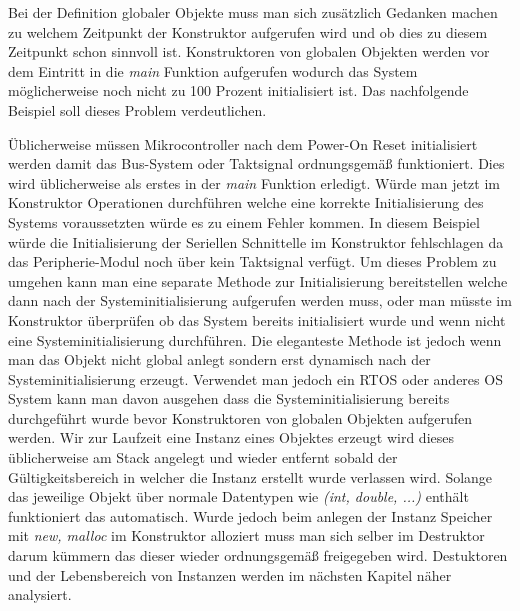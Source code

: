 \documentclass[MES,Master,ngerman]{twbook}%
\begin{document}
\begin{figure}[!htb]
	\begin{subfigure}[b]{0.5\textwidth}
		
		\label{fig:25}
	\end{subfigure}
	\begin{subfigure}[b]{0.5\textwidth}
		
		\label{fig:26}
	\end{subfigure}
\end{figure}

Bei der Definition globaler Objekte muss man sich zusätzlich Gedanken machen zu welchem Zeitpunkt der Konstruktor aufgerufen wird und ob dies zu diesem Zeitpunkt schon sinnvoll ist. Konstruktoren von globalen Objekten werden vor dem Eintritt in die \textit{main} Funktion aufgerufen wodurch das System möglicherweise noch nicht zu 100 Prozent initialisiert ist. Das nachfolgende Beispiel soll dieses Problem verdeutlichen. 

\begin{figure}[!htb]
	
	\label{fig:27}
\end{figure}

Üblicherweise müssen Mikrocontroller nach dem Power-On Reset initialisiert werden damit das Bus-System oder Taktsignal ordnungsgemäß funktioniert. Dies wird üblicherweise als erstes in der \textit{main} Funktion erledigt. Würde man jetzt im Konstruktor Operationen durchführen welche eine korrekte Initialisierung des Systems voraussetzten würde es zu einem Fehler kommen. In diesem Beispiel würde die Initialisierung der Seriellen Schnittelle im Konstruktor fehlschlagen da das Peripherie-Modul noch über kein Taktsignal verfügt. Um dieses Problem zu umgehen kann man eine separate Methode zur Initialisierung bereitstellen welche dann nach der Systeminitialisierung aufgerufen werden muss, oder man müsste im Konstruktor überprüfen ob das System bereits initialisiert wurde und wenn nicht eine Systeminitialisierung durchführen. Die eleganteste Methode ist jedoch wenn man das Objekt nicht global anlegt sondern erst dynamisch nach der Systeminitialisierung erzeugt. Verwendet man jedoch ein RTOS oder anderes OS System kann man davon ausgehen dass die Systeminitialisierung bereits durchgeführt wurde bevor Konstruktoren von globalen Objekten aufgerufen werden. \newline\newline
Wir zur Laufzeit eine Instanz eines Objektes erzeugt wird dieses üblicherweise am Stack angelegt und wieder entfernt sobald der Gültigkeitsbereich in welcher die Instanz erstellt wurde verlassen wird. Solange das jeweilige Objekt über normale Datentypen wie \textit{(int, double, ...)} enthält funktioniert das automatisch. Wurde jedoch beim anlegen der Instanz Speicher mit \textit{new, malloc} im Konstruktor alloziert muss man sich selber im Destruktor darum kümmern das dieser wieder ordnungsgemäß freigegeben wird. Destuktoren und der Lebensbereich von Instanzen werden im nächsten Kapitel näher analysiert.
\end{document}
